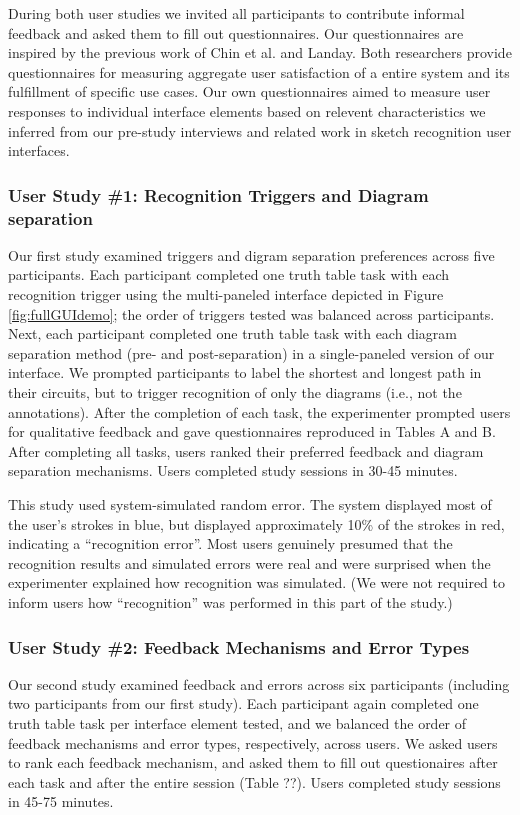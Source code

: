 \documentclass{egpubl}
\begin{document}
During both user studies we invited all participants to contribute
informal feedback and asked them to fill out questionnaires.  Our
questionnaires are inspired by the previous work of Chin et
al.\cite{57203} and Landay\cite{landay96thesis}.  Both researchers
provide questionnaires for measuring aggregate user satisfaction of a
entire system and its fulfillment of specific use cases.  Our own
questionnaires aimed to measure user responses to individual interface
elements based on relevent characteristics we inferred from our
pre-study interviews and related work in sketch recognition user
interfaces.

\subsubsection{User Study \#1: Recognition Triggers and Diagram
  separation} 

Our first study examined triggers and digram separation preferences
across five participants.  Each participant completed one truth table
task with each recognition trigger using the multi-paneled interface
depicted in Figure \ref{fig:fullGUIdemo}; the order of triggers tested
was balanced across participants.  Next, each participant completed
one truth table task with each diagram separation method (pre- and
post-separation) in a single-paneled version of our interface.  We
prompted participants to label the shortest and longest path in their
circuits, but to trigger recognition of only the diagrams (i.e., not
the annotations).  After the completion of each task, the experimenter
prompted users for qualitative feedback and gave questionnaires
reproduced in Tables A and B.  After completing all tasks, users
ranked their preferred feedback and diagram separation mechanisms.
Users completed study sessions in 30-45 minutes.

This study used system-simulated random error.  The system
displayed most of the user's strokes in blue, but displayed
approximately 10\% of the strokes in red, indicating a ``recognition
error''.  Most users genuinely presumed that the recognition results
and simulated errors were real and were surprised when the
experimenter explained how recognition was simulated.  (We were not
required to inform users how ``recognition'' was performed in this
part of the study.)

\subsubsection{User Study \#2: Feedback Mechanisms and Error Types}
Our second study examined feedback and errors across six participants
(including two participants from our first study).  Each participant
again completed one truth table task per interface element tested, and
we balanced the order of feedback mechanisms and error types,
respectively, across users.  We asked users to rank each feedback
mechanism, and asked them to fill out questionaires after each task
and after the entire session (Table ??).  Users completed study
sessions in 45-75 minutes.
\end{document}
